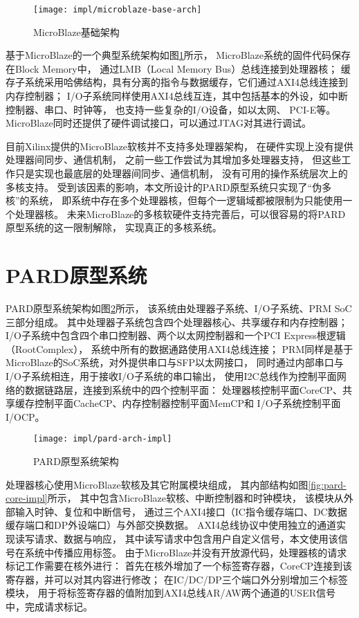 \begin{figure}[tb]
  \centering
  \texttt{[image: impl/microblaze-base-arch]}
  \caption{MicroBlaze基础架构}
  \label{fig:microblaze-base-arch}
\end{figure}


基于MicroBlaze的一个典型系统架构如图\ref{fig:microblaze-base-arch}所示，
MicroBlaze系统的固件代码保存在Block Memory中，
通过LMB（Local Memory Bus）总线连接到处理器核；
缓存子系统采用哈佛结构，具有分离的指令与数据缓存，它们通过AXI4总线连接到内存控制器；
I/O子系统同样使用AXI4总线互连，其中包括基本的外设，如中断控制器、串口、时钟等，
也支持一些复杂的I/O设备，如以太网\cite{axi-ethernet-subsystem}、
PCI-E\cite{axi-pcie-bridge}等。
MicroBlaze同时还提供了硬件调试接口，可以通过JTAG对其进行调试。

目前Xilinx提供的MicroBlaze软核并不支持多处理器架构，
在硬件实现上没有提供处理器间同步、通信机制，
之前一些工作\cite{microblaze-mp-rsp08,microblaze-mp-xapp}尝试为其增加多处理器支持，
但这些工作只是实现也最底层的处理器间同步、通信机制，
没有可用的操作系统层次上的多核支持。
受到该因素的影响，本文所设计的PARD原型系统只实现了``伪多核''的系统，
即系统中存在多个处理器核，但每个一逻辑域都被限制为只能使用一个处理器核。
未来MicroBlaze的多核软硬件支持完善后，可以很容易的将PARD原型系统的这一限制解除，
实现真正的多核系统。


\section{PARD原型系统}

PARD原型系统架构如图\ref{fig:pard-arch-impl}所示，
该系统由处理器子系统、I/O子系统、PRM SoC三部分组成。
其中处理器子系统包含四个处理器核心、共享缓存和内存控制器；
I/O子系统中包含四个串口控制器、两个以太网控制器和一个PCI Express根逻辑（RootComplex），
系统中所有的数据通路使用AXI4总线连接；
PRM同样是基于MicroBlaze的SoC系统，对外提供串口与SFP以太网接口，
同时通过内部串口与I/O子系统相连，用于接收I/O子系统的串口输出，
使用I2C总线作为控制平面网络的数据链路层，连接到系统中的四个控制平面：
处理器核控制平面CoreCP、共享缓存控制平面CacheCP、内存控制器控制平面MemCP和
I/O子系统控制平面I/OCP。

\begin{figure}[tb]
  \centering
  \texttt{[image: impl/pard-arch-impl]}
  \caption{PARD原型系统架构}
  \label{fig:pard-arch-impl}
\end{figure}

处理器核心使用MicroBlaze软核及其它附属模块组成，
其内部结构如图\ref{fig:pard-core-impl}所示，
其中包含MicroBlaze软核、中断控制器和时钟模块，
该模块从外部输入时钟、复位和中断信号，
通过三个AXI4接口（IC指令缓存端口、DC数据缓存端口和DP外设端口）与外部交换数据。
AXI4总线协议中使用独立的通道实现读写请求、数据与响应，
其中读写请求中包含用户自定义信号，本文使用该信号在系统中传播应用标签。
由于MicroBlaze并没有开放源代码，处理器核的请求标记工作需要在核外进行：
首先在核外增加了一个标签寄存器，CoreCP连接到该寄存器，并可以对其内容进行修改；
在IC/DC/DP三个端口外分别增加三个标签模块，
用于将标签寄存器的值附加到AXI4总线AR/AW两个通道的USER信号中，完成请求标记。

